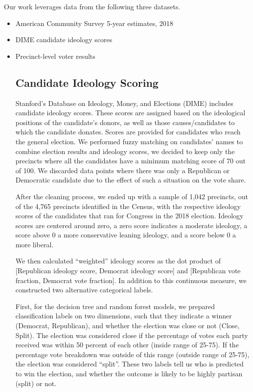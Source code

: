 \documentclass{article}
\begin{document}
Our work leverages data from the following three datasets. 
\begin{itemize}
    \item American Community Survey 5-year estimates, 2018
    \item DIME candidate ideology scores
    \item Precinct-level voter results

\subsection{Candidate Ideology Scoring}


Stanford’s Database on Ideology, Money, and Elections (DIME) includes candidate ideology scores. These scores are assigned based on the ideological positions of the candidate’s donors, as well as those causes/candidates to which the candidate donates. Scores are provided for candidates who reach the general election. We performed fuzzy matching on candidates’ names to combine election results and ideology scores, we decided to keep only the precincts where all the candidates have a minimum matching score of 70 out of 100. We discarded data points where there was only a Republican or Democratic candidate due to the effect of such a situation on the vote share. 

After the cleaning process, we ended up with a sample of 1,042 precincts, out of the 4,765 precincts identified in the Census, with the respective ideology scores of the candidates that ran for Congress in the 2018 election. Ideology scores are centered around zero, a zero score indicates a moderate ideology, a score above 0 a more conservative leaning ideology, and a score below 0 a more liberal. 

We then calculated “weighted” ideology scores as the dot product of [Republican ideology score, Democrat ideology score] and [Republican vote fraction, Democrat vote fraction]. In addition to this continuous measure, we constructed two alternative categorical labels.

First, for the decision tree and random forest models, we prepared classification labels on two dimensions, such that they indicate a winner (Democrat, Republican), and whether the election was close or not (Close, Split). The election was considered close if the percentage of votes each party received was within 50 percent of each other (inside range of 25-75). If the percentage vote breakdown was outside of this range (outside range of 25-75), the election was considered “split”. These two labels tell us who is predicted to win the election, and whether the outcome is likely to be highly partisan (split) or not.


\end{itemize}
\end{document}
